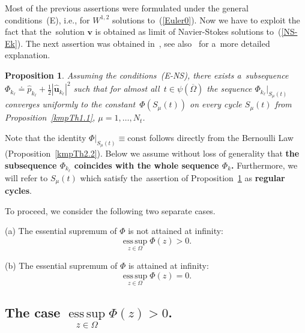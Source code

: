\documentclass[11pt]{article}
\newtheorem{proposition}[theorem]{Proposition}
\numberwithin{equation}{section}
\numberwithin{figure}{section}
\newcommand{\esssup}{\mathop{\mathrm{ess\,sup}}}
\def\const{{\mathrm{const}}}
\def\ve{{\mathbf v}}
\def\ue{{\mathbf u}}
\begin{document}
Most of the previous assertions were formulated under the general conditions~(E), i.e., for $W^{1,2}$ solutions to~(\ref{Euler0}). Now we have to exploit the fact that the~solution $\ve$ is obtained as limit of Navier-Stokes solutions to~(\ref{NS-Ek}).
The next assertion was obtained in~\cite[Lemma~3.3]{kpr}, see also~\cite[Lemma~5.4.8]{korobkov2024steady} for a~more detailed explanation. 

\begin{proposition}
\label{regc-ax} {\sl Assuming the conditions~{\rm (E-NS)}, there exists
a~subsequence~$\Phi_{k_\ell} \doteq \widehat{p}_{k_\ell}+ \frac12 |\widehat{\ue}_{k_\ell}|^2$ such that for almost all~$t\in\psi(\overline{\Omega})$  the sequence $\Phi_{k_\ell}|_{S_{\mu}(t)}$ converges uniformly to
the constant~$\Phi(S_{\mu}(t))$ on every cycle $S_{\mu}(t)$ from Proposition~\ref{kmpTh1.1}, $\mu=1,\dots,N_t$.}
\end{proposition}

Note that the identity $\Phi|_{S_{\mu}(t)}\equiv\const$ follows directly from the Bernoulli Law (Proposition~\ref{kmpTh2.2}).  Below we assume without loss of generality that {\bf the subsequence
$\Phi_{k_\ell}$ coincides with the whole sequence $\Phi_{k}$.}
Furthermore, we will refer to   $S_{\mu}(t)$  which
satisfy the~assertion of Proposition~\ref{regc-ax} as {\bf regular cycles}.

To proceed, we consider the following two
separate cases.

\smallskip

(a) The essential supremum of $\Phi$ is not attained at
infinity:
\begin{equation}\label{as-prev1}
\esssup\limits_{z\in\Omega}\Phi(z)>0.
\end{equation}

(b) The essential supremum of $\Phi$ is attained at
infinity:
\begin{equation}\label{as1-axxx} \esssup\limits_{z\in\Omega}\Phi(z)=0.
\end{equation}


\subsection*{The case $\esssup\limits_{z\in\Omega}\Phi(z)>0$.}
\label{EPcontr-axx}
\end{document}
